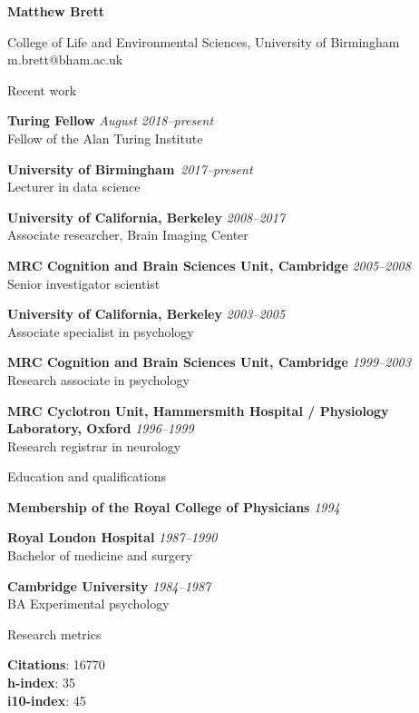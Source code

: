 \documentclass[11pt]{cv}
\newcommand{\PlaceDate}[2]{{\bf #1} \hfill {\em #2} \\}
\newcommand{\PlaceDateNote}[3]{{\bf #1} \hfill {\em #2} \\#3}
\newcommand{\UCB}{University of California, Berkeley}
\newcommand{\UoB}{University of Birmingham\,}
\newcommand{\CBU}{MRC Cognition and Brain Sciences Unit, Cambridge}
\begin{document}
{\huge \bf Matthew Brett}

College of Life and Environmental Sciences, University of Birmingham \\
m.brett@bham.ac.uk

\begin{cvSection}{Recent work}

\PlaceDateNote{Turing Fellow}{August 2018--present}
    {Fellow of the Alan Turing Institute}

\PlaceDateNote{\UoB}{2017--present }{
Lecturer in data science}

\PlaceDateNote{\UCB}{2008--2017 }{
Associate researcher, Brain Imaging Center}

\PlaceDateNote{\CBU}{2005--2008}{
    Senior investigator scientist}

\PlaceDateNote{\UCB}{2003--2005 }{
    Associate specialist in psychology}

\PlaceDateNote{\CBU}{1999--2003 }{
    Research associate in psychology}

\PlaceDateNote{
MRC Cyclotron Unit, Hammersmith Hospital / Physiology Laboratory, Oxford}
{1996--1999}
    {Research registrar in neurology}

\end{cvSection}

\begin{cvSection}{Education and qualifications}

{\bf Membership of the Royal College of Physicians} \hfill {\em 1994}

\PlaceDate{Royal London Hospital}{1987--1990 }
Bachelor of medicine and surgery

\PlaceDateNote{Cambridge University}{1984--1987 }{
BA Experimental psychology}

\end{cvSection}

\begin{cvSection}{Research metrics}

{\bf Citations}: 16770 \\
{\bf h-index}: 35 \\
{\bf i10-index}: 45

\end{cvSection}
\end{document}
